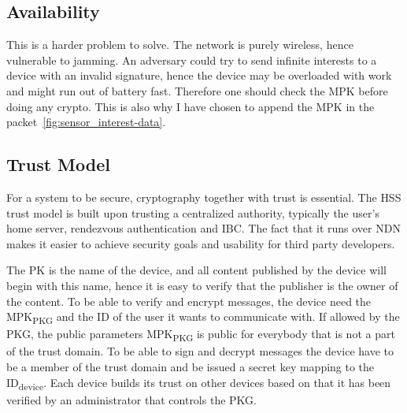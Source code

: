 \subsection{Availability}
This is a harder problem to solve.
The network is purely wireless, hence vulnerable to jamming. 
An adversary could try to send infinite \gls{interest}s to a device with an invalid signature, hence the device may be overloaded with work and might run out of battery fast.
Therefore one should check the \gls{MPK} before doing any crypto.
This is also why I have chosen to append the MPK in the packet~\autoref{fig:sensor_interest-data}. 

\subsection{Trust Model}
For a system to be secure, cryptography together with trust is essential. 
The \gls{HSS} trust model is built upon trusting a centralized authority, typically the user's home server, rendezvous authentication and \gls{IBC}.
The fact that it runs over \gls{NDN} makes it easier to achieve security goals and usability for third party developers.

The \gls{PK} is the \gls{name} of the device, and all content published by the device will begin with this \gls{name}, hence it is easy to verify that the \gls{publisher} is the owner of the content.
To be able to verify and encrypt messages, the device need the MPK\textsubscript{PKG} and the ID of the user it wants to communicate with. 
If allowed by the PKG, the public parameters MPK\textsubscript{PKG} is public for everybody that is not a part of the trust domain. 
To be able to sign and decrypt messages the device have to be a member of the trust domain and be issued a secret key mapping to the ID\textsubscript{device}.
Each device builds its trust on other devices based on that it has been verified by an administrator that controls the \gls{PKG}.
